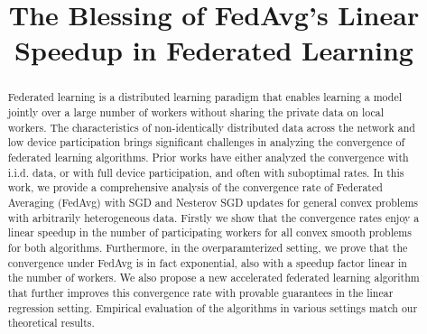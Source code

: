 \documentclass{article}
\title{The Blessing of FedAvg's Linear Speedup in Federated Learning}
\author{}
\begin{document}
\maketitle

\begin{abstract}
Federated learning is a distributed learning paradigm that enables learning
a model jointly over a large number of workers without sharing the private
data on local workers. The characteristics of non-identically distributed data
across the network and low device participation brings significant challenges
in analyzing the convergence of federated learning algorithms. Prior works
have either analyzed the convergence with i.i.d. data, or with full device
participation, and often with suboptimal rates. In this work, we provide a
comprehensive analysis of the convergence rate of Federated Averaging (FedAvg)
with SGD and Nesterov SGD updates for general convex problems with arbitrarily
heterogeneous data. Firstly we show that the convergence rates enjoy a linear
speedup in the number of participating workers for all convex smooth problems
for both algorithms.  Furthermore, in the overparamterized setting, we prove that the convergence under FedAvg is in fact exponential, also with a speedup factor linear in the number of workers. We also propose a new accelerated federated learning algorithm that further improves this convergence rate with provable guarantees in the linear regression setting. Empirical evaluation of the algorithms in various settings match our theoretical results.
\end{abstract}











\newpage



\appendix

\end{document}
